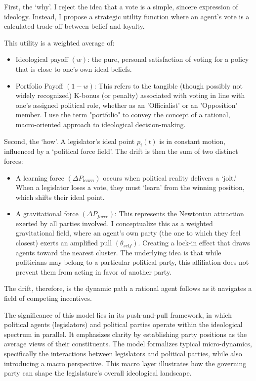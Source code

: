 \documentclass{article}
\begin{document}
	First, the `why'. I reject the idea that a vote is a simple, sincere expression of ideology. Instead, I propose a strategic utility function where an agent's vote is a calculated trade-off between belief and loyalty.
	
	This utility is a weighted average of:
	\begin{itemize}
		\item Ideological payoff $(w)$: the pure, personal satisfaction of voting for a policy that is close to one's own ideal beliefs.
		\item Portfolio Payoff $(1-w)$: This refers to the tangible (though possibly not widely recognized) K-bonus (or penalty) associated with voting in line with one's assigned political role, whether as an 'Officialist' or an 'Opposition' member. I use the term "portfolio" to convey the concept of a rational, macro-oriented approach to ideological decision-making.
	\end{itemize}
	
	Second, the `how'. A legislator's ideal point $p_{i}(t)$ is in constant motion, influenced by a `political force field'. The drift is then the sum of two distinct forces:
	\begin{itemize}
		\item A learning force $(\Delta P_{learn})$ occurs when political reality delivers a `jolt.' When a legislator loses a vote, they must `learn' from the winning position, which shifts their ideal point.
		\item A gravitational force $(\Delta P_{force})$: This represents the Newtonian attraction exerted by all parties involved. I conceptualize this as a weighted gravitational field, where an agent's own party (the one to which they feel closest) exerts an amplified pull $(\theta_{self})$. Creating a lock-in effect that draws agents toward the nearest cluster. The underlying idea is that while politicians may belong to a particular political party, this affiliation does not prevent them from acting in favor of another party.
	\end{itemize}
	
	The drift, therefore, is the dynamic path a rational agent follows as it navigates a field of competing incentives.
	
	The significance of this model lies in its push-and-pull framework, in which political agents (legislators) and political parties operate within the ideological spectrum in parallel. It emphasizes clarity by establishing party positions as the average views of their constituents. The model formalizes typical micro-dynamics, specifically the interactions between legislators and political parties, while also introducing a macro perspective. This macro layer illustrates how the governing party can shape the legislature's overall ideological landscape.
	
\end{document}
